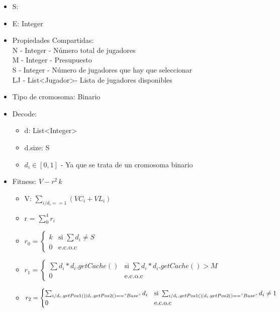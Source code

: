 \documentclass[a4paper,12pt]{article}
\begin{document}
\begin{itemize}
  \item S:
  \item E: Integer
  \item Propiedades Compartidas:\\
  N - Integer - Número total de jugadores\\
  M - Integer - Presupuesto\\
  S - Integer - Número de jugadores que hay que seleccionar\\
  LJ - List\textless Jugador\textgreater - Lista de jugadores disponibles\\

  \item Tipo de cromosoma: Binario
  \item Decode:
  \begin{itemize}
    \item d: List\textless Integer\textgreater
    \item d.size: S
    \item $ d_i \in [0,1] $ - Ya que se trata de un cromosoma binario
  \end{itemize}
  \item Fitness: $V - r^2 \,k$
  \begin{itemize}
    \item V: $\sum_{i / d_i == 1}{(VC_i + VL_i)}$
    \item r = $\sum_{0}^{4}{r_i}$

    \item $r_0 =
    \begin{cases}
      k &\mbox{si } \sum{d_i} \neq S\\
      0 &\mbox{e.c.o.c }
    \end{cases}
    $

    \item $r_1 =
      \begin{cases}
        \sum{d_i*d_i.getCache()} &\mbox{si } \sum{d_i*d_i.getCache()} > M\\
        0 &\mbox{e.c.o.c }
      \end{cases}
      $

    \item $r_2 =
      \begin{cases}
      \sum_{i / d_i.getPos1()|d_i.getPos2()=="Base"}{d_i}  &\mbox{si } \sum_{i / d_i.getPos1()|d_i.getPos2()=="Base"}{d_i} \neq 1
      \\
      0 &\mbox{e.c.o.c}
      \end{cases}
      $


\end{itemize}
\end{itemize}
\end{document}
